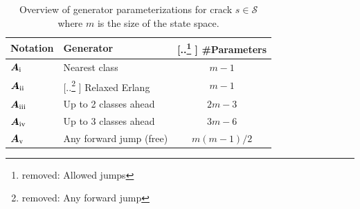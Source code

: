 \documentclass{article}
\newcommand{\RN}[1]{\textup{\uppercase\expandafter{\romannumeral#1}}}
\providecommand{\DIFadd}[1]{{\protect\color{blue} \sf #1}} %
\providecommand{\DIFdel}[1]{{\protect\color{red} [..\footnote{removed: #1} ]}} %
\providecommand{\DIFaddFL}[1]{\DIFadd{#1}} %
\providecommand{\DIFdelFL}[1]{\DIFdel{#1}} %
\providecommand{\DIFaddbeginFL}{} %
\providecommand{\DIFaddendFL}{} %
\providecommand{\DIFdelbeginFL}{} %
\providecommand{\DIFdelendFL}{} %
\begin{document}
\begin{table}[htb!]
\centering
\caption{Overview of generator parameterizations for crack $s \in \mathcal{S}$ where $m$ is the size of the state space.}
\label{tab:generators_overview}
\DIFdelbeginFL %
\DIFdelendFL \DIFaddbeginFL \begin{tabular}{@{}llc@{}}
\DIFaddendFL \toprule
\DIFaddbeginFL \DIFaddFL{Notation }& \DIFaddendFL Generator & \DIFdelbeginFL \DIFdelFL{Allowed jumps }%
\DIFdelendFL \#Parameters \\%
\midrule
$\bm{A}_{\RN{1}}$ & Nearest class & $m - 1$ \\%
$\bm{A}_{\RN{2}}$ & \DIFdelbeginFL \DIFdelFL{Any forward jump }\DIFdelendFL \DIFaddbeginFL \DIFaddFL{Relaxed Erlang }\DIFaddendFL & $m - 1$ \\%
$\bm{A}_{\RN{3}}$ & Up to 2 classes ahead & $2m - 3$ \\%
$\bm{A}_{\RN{4}}$ & Up to 3 classes ahead & $3m - 6$ \\%
$\bm{A}_{\RN{5}}$ & Any forward jump (free) & $m(m-1)/2$ \\%
\bottomrule
\end{tabular}
\end{table}
\end{document}
